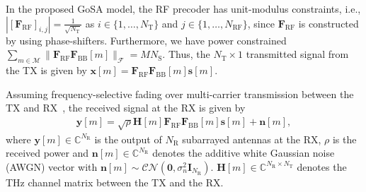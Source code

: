 \documentclass[journal,10pt]{IEEEtran}
\begin{document}
	In the proposed GoSA model, the RF precoder has unit-modulus constraints, i.e., $|[\mathbf{F}_\mathrm{RF}]_{i,j}| = \frac{1}{\sqrt{N_\mathrm{T}}}$ as $i \in \{1,\dots, N_\mathrm{T}\}$ and $j \in \{1,\dots, N_\mathrm{RF}\}$, since $\mathbf{F}_\mathrm{RF}$ is constructed by using phase-shifters. Furthermore, we have power constrained $\sum_{m \in \mathcal{M}}\|\mathbf{F}_\mathrm{RF}\mathbf{F}_\mathrm{BB} [m] \|_{\mathcal{F}} = MN_\mathrm{S}$. Thus, the $N_\mathrm{T}\times 1$ transmitted signal from the TX is given by $		\mathbf{x}[m] = \mathbf{F}_\mathrm{RF}\mathbf{F}_\mathrm{BB}[m]\mathbf{s}[m].$
	
	
	
	
	
	
	
	
	
	
	{\color{black}Assuming frequency-selective fading over multi-carrier transmission between the TX and  RX~\cite{ummimoTareq}, the received signal at the RX is given by
		\begin{align}
		\label{receivedSignal}
		\mathbf{y}[m] = \sqrt{\rho} \mathbf{H}[m] \mathbf{F}_\mathrm{RF} \mathbf{F}_\mathrm{BB}[m]\mathbf{s}[m] + \mathbf{n}[m],
		\end{align}
		where $\mathbf{y}[m]\in \mathbb{C}^{N_\mathrm{R}}$ is the output of $N_\mathrm{R}$ subarrayed antennas at the RX, $\rho$ is the received power and $\mathbf{n}[m]\in \mathbb{C}^{N_\mathrm{R}}$ denotes the additive white Gaussian noise (AWGN) vector with $\mathbf{n}[m]\sim \mathcal{CN}(\mathbf{0}, \sigma_n^2\mathbf{I}_{N_\mathrm{R}})$. $\mathbf{H}[m]\in \mathbb{C}^{N_\mathrm{R}\times N_\mathrm{T}}$ denotes the THz channel matrix between the TX and the RX. }
	
	
	
\end{document}
